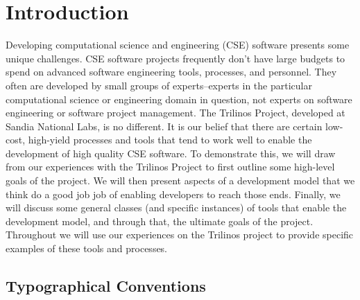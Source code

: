 \documentclass[12pt,relax]{article}
\begin{document}
\clearpage
\tableofcontents
\listoftables

\clearpage
%


\section{Introduction}
\label{Section:Introduction}

Developing computational science and engineering (CSE) software presents some 
unique challenges.  CSE software projects frequently don't have large budgets 
to spend on advanced software engineering tools, processes, and personnel.  
They often are developed by small groups of experts--experts in the particular 
computational science or engineering domain in question, not experts on 
software engineering or software project management.  The Trilinos Project,
developed at Sandia National Labs, is no different.  It is our belief that 
there are certain low-cost, high-yield processes and tools that tend to work 
well to enable the development of high quality CSE software.  To demonstrate 
this, we will draw from our experiences with the Trilinos Project to first
outline some high-level goals of the project.  We will then present aspects of
a development model that we think do a good job job of enabling developers to
reach those ends.  Finally, we will discuss some general classes (and specific
instances) of tools that enable the development model, and through that, 
the ultimate goals of the project.  Throughout we will use our experiences on 
the Trilinos project to provide specific examples of these tools and processes.

\subsection{Typographical Conventions}
\end{document}
